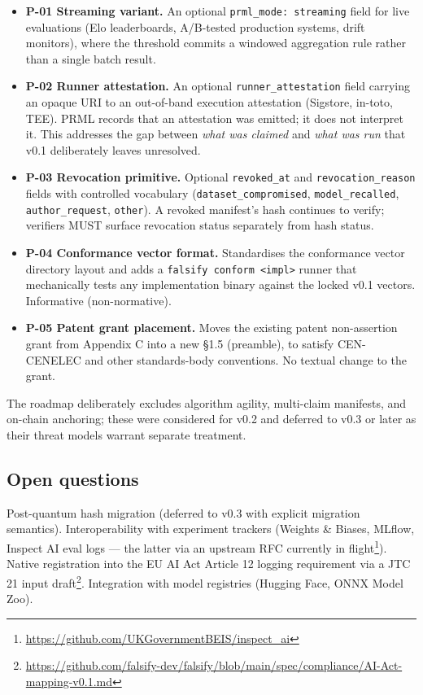 \documentclass[11pt, a4paper]{article}
\begin{document}
\begin{itemize}[leftmargin=2em, itemsep=0.2em]
  \item \textbf{P-01 Streaming variant.} An optional \texttt{prml\_mode: streaming} field for live evaluations (Elo leaderboards, A/B-tested production systems, drift monitors), where the threshold commits a windowed aggregation rule rather than a single batch result.
  \item \textbf{P-02 Runner attestation.} An optional \texttt{runner\_attestation} field carrying an opaque URI to an out-of-band execution attestation (Sigstore, in-toto, TEE). PRML records that an attestation was emitted; it does not interpret it. This addresses the gap between \emph{what was claimed} and \emph{what was run} that v0.1 deliberately leaves unresolved.
  \item \textbf{P-03 Revocation primitive.} Optional \texttt{revoked\_at} and \texttt{revocation\_reason} fields with controlled vocabulary (\texttt{dataset\_compromised}, \texttt{model\_recalled}, \texttt{author\_request}, \texttt{other}). A revoked manifest's hash continues to verify; verifiers MUST surface revocation status separately from hash status.
  \item \textbf{P-04 Conformance vector format.} Standardises the conformance vector directory layout and adds a \texttt{falsify conform <impl>} runner that mechanically tests any implementation binary against the locked v0.1 vectors. Informative (non-normative).
  \item \textbf{P-05 Patent grant placement.} Moves the existing patent non-assertion grant from Appendix C into a new §1.5 (preamble), to satisfy CEN-CENELEC and other standards-body conventions. No textual change to the grant.
\end{itemize}

The roadmap deliberately excludes algorithm agility, multi-claim manifests, and on-chain anchoring; these were considered for v0.2 and deferred to v0.3 or later as their threat models warrant separate treatment.

\subsection{Open questions}

Post-quantum hash migration (deferred to v0.3 with explicit migration semantics). Interoperability with experiment trackers (Weights \& Biases, MLflow, Inspect AI eval logs --- the latter via an upstream RFC currently in flight\footnote{\url{https://github.com/UKGovernmentBEIS/inspect_ai}}). Native registration into the EU AI Act Article 12 logging requirement via a JTC 21 input draft\footnote{\url{https://github.com/falsify-dev/falsify/blob/main/spec/compliance/AI-Act-mapping-v0.1.md}}. Integration with model registries (Hugging Face, ONNX Model Zoo).
\end{document}

